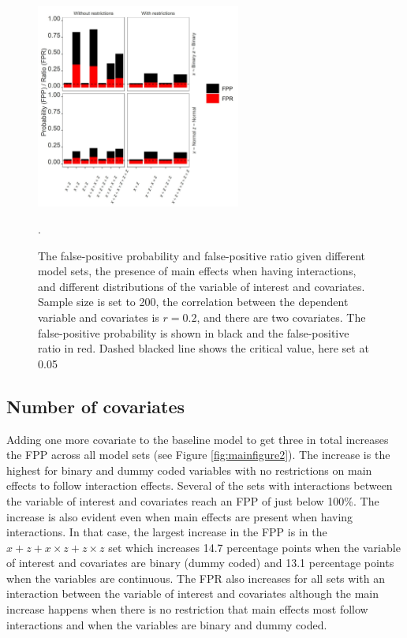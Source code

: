 \begin{figure}[hbt!]
\includegraphics[width=0.6\textwidth]{R/Analysis/Result/Figures/Figure1A.jpeg}
\centering
\caption{The false-positive probability and false-positive ratio given different model sets, the presence of main effects when having interactions, and different distributions of the variable of interest and covariates. Sample size is set to 200, the correlation between the dependent variable and covariates is $r=0.2$, and there are two covariates. The false-positive probability is shown in black and the false-positive ratio in red. Dashed blacked line shows the critical value, here set at 0.05 }.
\label{fig:mainfigure1}
\end{figure}

\subsection{Number of covariates}
Adding one more covariate to the baseline model to get three in total increases the FPP across all model sets (see Figure \ref{fig:mainfigure2}). The increase is the highest for binary and dummy coded variables with no restrictions on main effects to follow interaction effects. Several of the sets with interactions between the variable of interest and covariates reach an FPP of just below 100\%. The increase is also evident even when main effects are present when having interactions. In that case, the largest increase in the FPP is in the $x + z+ x \times z + z \times z$ set which increases 14.7 percentage points when the variable of interest and covariates are binary (dummy coded) and 13.1 percentage points when the variables are continuous. The FPR also increases for all sets with an interaction between the variable of interest and covariates although the main increase happens when there is no restriction that main effects most follow interactions and when the variables are binary and dummy coded.

